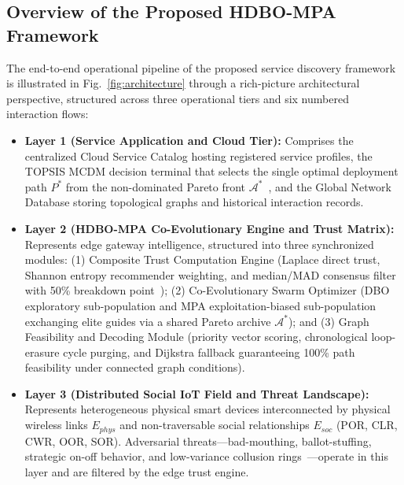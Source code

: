 \documentclass[journal,compsoc]{IEEEtran}
\begin{document}
\subsection{Overview of the Proposed HDBO-MPA Framework}
The end-to-end operational pipeline of the proposed service discovery framework is illustrated in Fig.~\ref{fig:architecture} through a rich-picture architectural perspective, structured across three operational tiers and six numbered interaction flows:
\begin{itemize}
    \item \textbf{Layer 1 (Service Application and Cloud Tier):} Comprises the centralized Cloud Service Catalog hosting registered service profiles, the TOPSIS MCDM decision terminal that selects the single optimal deployment path $P^*$ from the non-dominated Pareto front $\mathcal{A}^*$~\cite{mendez2020topsis}, and the Global Network Database storing topological graphs and historical interaction records.
    \item \textbf{Layer 2 (HDBO-MPA Co-Evolutionary Engine and Trust Matrix):} Represents edge gateway intelligence, structured into three synchronized modules: (1) Composite Trust Computation Engine (Laplace direct trust, Shannon entropy recommender weighting, and median/MAD consensus filter with 50\% breakdown point~\cite{rousseeuw2020statistical}); (2) Co-Evolutionary Swarm Optimizer (DBO exploratory sub-population and MPA exploitation-biased sub-population exchanging elite guides via a shared Pareto archive $\mathcal{A}^*$); and (3) Graph Feasibility and Decoding Module (priority vector scoring, chronological loop-erasure cycle purging, and Dijkstra fallback guaranteeing 100\% path feasibility under connected graph conditions).
    \item \textbf{Layer 3 (Distributed Social IoT Field and Threat Landscape):} Represents heterogeneous physical smart devices interconnected by physical wireless links $E_{phys}$ and non-traversable social relationships $E_{soc}$ (POR, CLR, CWR, OOR, SOR). Adversarial threats—bad-mouthing, ballot-stuffing, strategic on-off behavior, and low-variance collusion rings~\cite{zhang2025trust}—operate in this layer and are filtered by the edge trust engine.
\end{itemize}
\end{document}
